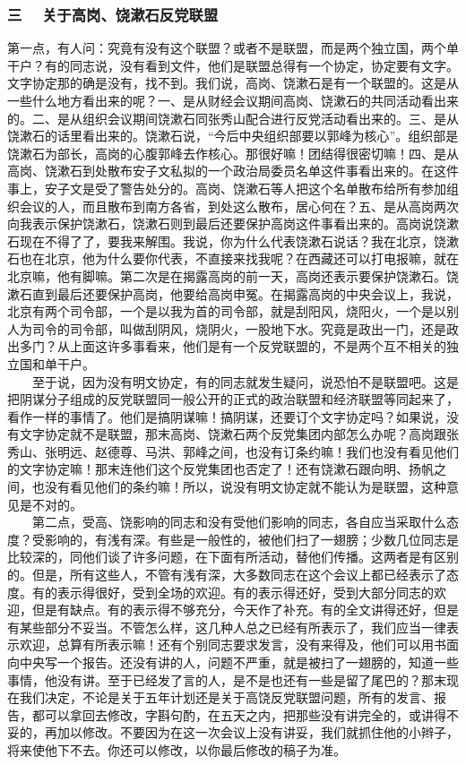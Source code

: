 \documentclass[cn,11pt,chinese]{elegantbook}
\def\myformat#1{\hfil\hfil #1}
\begin{document}
\subsubsection*{\myformat{三　  关于高岗、饶漱石反党联盟}}
第一点，有人问：究竟有没有这个联盟？或者不是联盟，而是两个独立国，两个单干户？有的同志说，没有看到文件，他们是联盟总得有一个协定，协定要有文字。文字协定那的确是没有，找不到。我们说，高岗、饶漱石是有一个联盟的。这是从一些什么地方看出来的呢？一、是从财经会议期间高岗、饶漱石的共同活动看出来的。二、是从组织会议期间饶漱石同张秀山配合进行反党活动看出来的。三、是从饶漱石的话里看出来的。饶漱石说，“今后中央组织部要以郭峰为核心”。组织部是饶漱石为部长，高岗的心腹郭峰去作核心。那很好嘛！团结得很密切嘛！四、是从高岗、饶漱石到处散布安子文私拟的一个政治局委员名单这件事看出来的。在这件事上，安子文是受了警告处分的。高岗、饶漱石等人把这个名单散布给所有参加组织会议的人，而且散布到南方各省，到处这么散布，居心何在？五、是从高岗两次向我表示保护饶漱石，饶漱石则到最后还要保护高岗这件事看出来的。高岗说饶漱石现在不得了了，要我来解围。我说，你为什么代表饶漱石说话？我在北京，饶漱石也在北京，他为什么要你代表，不直接来找我呢？在西藏还可以打电报嘛，就在北京嘛，他有脚嘛。第二次是在揭露高岗的前一天，高岗还表示要保护饶漱石。饶漱石直到最后还要保护高岗，他要给高岗申冤。在揭露高岗的中央会议上，我说，北京有两个司令部，一个是以我为首的司令部，就是刮阳风，烧阳火，一个是以别人为司令的司令部，叫做刮阴风，烧阴火，一股地下水。究竟是政出一门，还是政出多门？从上面这许多事看来，他们是有一个反党联盟的，不是两个互不相关的独立国和单干户。\\
　　至于说，因为没有明文协定，有的同志就发生疑问，说恐怕不是联盟吧。这是把阴谋分子组成的反党联盟同一般公开的正式的政治联盟和经济联盟等同起来了，看作一样的事情了。他们是搞阴谋嘛！搞阴谋，还要订个文字协定吗？如果说，没有文字协定就不是联盟，那末高岗、饶漱石两个反党集团内部怎么办呢？高岗跟张秀山、张明远、赵德尊、马洪、郭峰之间，也没有订条约嘛！我们也没有看见他们的文字协定嘛！那末连他们这个反党集团也否定了！还有饶漱石跟向明、扬帆之间，也没有看见他们的条约嘛！所以，说没有明文协定就不能认为是联盟，这种意见是不对的。\\
　　第二点，受高、饶影响的同志和没有受他们影响的同志，各自应当采取什么态度？受影响的，有浅有深。有些是一般性的，被他们扫了一翅膀；少数几位同志是比较深的，同他们谈了许多问题，在下面有所活动，替他们传播。这两者是有区别的。但是，所有这些人，不管有浅有深，大多数同志在这个会议上都已经表示了态度。有的表示得很好，受到全场的欢迎。有的表示得还好，受到大部分同志的欢迎，但是有缺点。有的表示得不够充分，今天作了补充。有的全文讲得还好，但是有某些部分不妥当。不管怎么样，这几种人总之已经有所表示了，我们应当一律表示欢迎，总算有所表示嘛！还有个别同志要求发言，没有来得及，他们可以用书面向中央写一个报告。还没有讲的人，问题不严重，就是被扫了一翅膀的，知道一些事情，他没有讲。至于已经发了言的人，是不是也还有一些是留了尾巴的？那末现在我们决定，不论是关于五年计划还是关于高饶反党联盟问题，所有的发言、报告，都可以拿回去修改，字斟句酌，在五天之内，把那些没有讲完全的，或讲得不妥的，再加以修改。不要因为在这一次会议上没有讲妥，我们就抓住他的小辫子，将来使他下不去。你还可以修改，以你最后修改的稿子为准。\\
\end{document}
